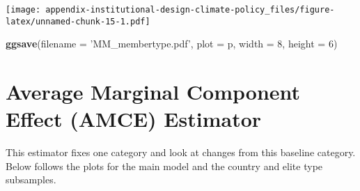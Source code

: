 \documentclass[12pt,a4paper,]{article}
\newenvironment{Shaded}{\begin{snugshade}}{\end{snugshade}}
\newcommand{\DataTypeTok}[1]{\textcolor[rgb]{0.13,0.29,0.53}{#1}}
\newcommand{\DecValTok}[1]{\textcolor[rgb]{0.00,0.00,0.81}{#1}}
\newcommand{\KeywordTok}[1]{\textcolor[rgb]{0.13,0.29,0.53}{\textbf{#1}}}
\newcommand{\NormalTok}[1]{#1}
\newcommand{\StringTok}[1]{\textcolor[rgb]{0.31,0.60,0.02}{#1}}
\begin{document}
\texttt{[image: appendix-institutional-design-climate-policy\_files/figure-latex/unnamed-chunk-15-1.pdf]}

\begin{Shaded}
\begin{Highlighting}[]
\KeywordTok{ggsave}\NormalTok{(}\DataTypeTok{filename =} \StringTok{'MM_membertype.pdf'}\NormalTok{, }\DataTypeTok{plot =}\NormalTok{ p, }
       \DataTypeTok{width =} \DecValTok{8}\NormalTok{, }\DataTypeTok{height =} \DecValTok{6}\NormalTok{)}
\end{Highlighting}
\end{Shaded}

\hypertarget{average-marginal-component-effect-amce-estimator}{%
\section{\texorpdfstring{Average Marginal Component Effect (AMCE)
Estimator
\label{sec:amce}}{Average Marginal Component Effect (AMCE) Estimator }}\label{average-marginal-component-effect-amce-estimator}}

This estimator fixes one category and look at changes from this baseline
category. Below follows the plots for the main model and the country and
elite type subsamples.
\end{document}
